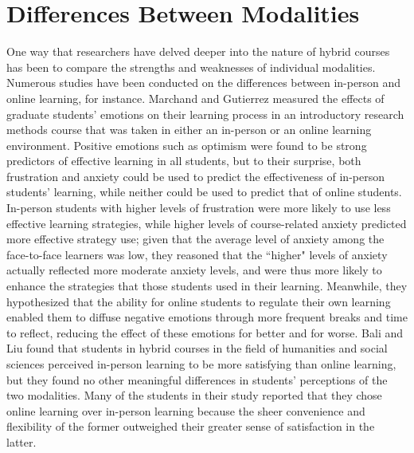 \section{Differences Between Modalities}

One way that researchers have delved deeper into the nature of hybrid courses has been to compare the strengths and weaknesses of individual modalities. Numerous studies have been conducted on the differences between in-person and online learning, for instance. Marchand and Gutierrez \cite{marchand2012role} measured the effects of graduate students’ emotions on their learning process in an introductory research methods course that was taken in either an in-person or an online learning environment. Positive emotions such as optimism were found to be strong predictors of effective learning in all students, but to their surprise, both frustration and anxiety could be used to predict the effectiveness of in-person students' learning, while neither could be used to predict that of online students. In-person students with higher levels of frustration were more likely to use less effective learning strategies, while higher levels of course-related anxiety predicted more effective strategy use; given that the average level of anxiety among the face-to-face learners was low, they reasoned that the ``higher" levels of anxiety actually reflected more moderate anxiety levels, and were thus more likely to enhance the strategies that those students used in their learning. Meanwhile, they hypothesized that the ability for online students to regulate their own learning enabled them to diffuse negative emotions through more frequent breaks and time to reflect, reducing the effect of these emotions for better and for worse. Bali and Liu \cite{bali2018students} found that students in hybrid courses in the field of humanities and social sciences perceived in-person learning to be more satisfying than online learning, but they found no other meaningful differences in students’ perceptions of the two modalities. Many of the students in their study reported that they chose online learning over in-person learning because the sheer convenience and flexibility of the former outweighed their greater sense of satisfaction in the latter.

